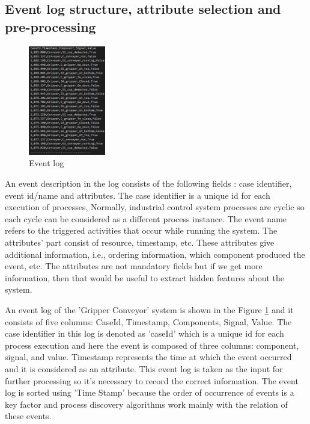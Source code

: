 \documentclass[conference]{IEEEtran}
\begin{document}
\subsection{Event log structure, attribute selection and pre-processing}

\begin{figure}[!t]
	\centering
	\includegraphics[width=0.3\textwidth]{images/EL.PNG}
	\caption{Event log}
	\label{fig:EL}
\end{figure}

 An event description in the log consists of the following fields \cite{paper2}: case identifier, event id/name and attributes. The case identifier is a unique id for each execution of processes, Normally, industrial control system processes are cyclic so each cycle can be considered as a different process instance. The event name refers to the triggered activities that occur while running the system. The attributes’ part consist of resource, timestamp, etc. These attributes give additional information, i.e., ordering information, which component produced the event, etc. The attributes are not mandatory fields but if we get more information, then that would be useful to extract hidden features about the system.

 An event log of the 'Gripper Conveyor' system is shown in the Figure \ref{fig:EL} and it consists of five columns: CaseId, Timestamp, Components, Signal, Value. The case identifier in this log is denoted as 'caseId' which is a unique id for each process execution and here the event is composed of three columns: component, signal, and value. Timestamp represents the time at which the event occurred and it is considered as an attribute. This event log is taken as the input for further processing so it's necessary to record the correct information. The event log is sorted using 'Time Stamp' because the order of occurrence of events is a key factor and process discovery algorithms work mainly with the relation of these events.
 
\end{document}
